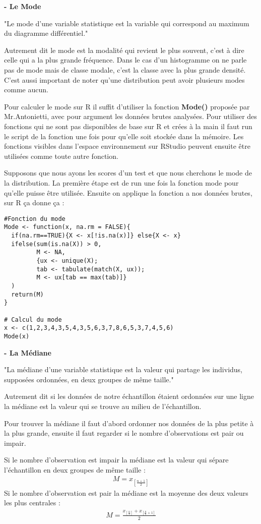 \documentclass{report}
\begin{document}
\textbf{- Le Mode}

"Le mode d'une variable statistique est la variable qui correspond au maximum du diagramme différentiel."

Autrement dit le mode est la modalité qui revient le plus souvent, c'est à dire celle qui a la plus grande fréquence. Dans le cas d'un histogramme on ne parle pas de mode mais de classe modale, c'est la classe avec la plus grande densité. C'est aussi important de noter qu'une distribution peut avoir plusieurs modes comme aucun.

Pour calculer le mode sur R il suffit d'utiliser la fonction \textbf{Mode()} proposée par Mr.Antonietti, avec pour argument les données brutes analysées. Pour utiliser des fonctions qui ne sont pas disponibles de base sur R et crées à la main il faut run le script de la fonction une fois pour qu'elle soit stockée dans la mémoire. Les fonctions visibles dans l'espace environnement sur RStudio peuvent ensuite être utilisées comme toute autre fonction.

Supposons que nous ayons les scores d'un test et que nous cherchons le mode de la distribution. La première étape est de run une fois la fonction mode pour qu'elle puisse être utilisée. Ensuite on applique la fonction a nos données brutes, sur R ça donne ça :

\begin{verbatim}
#Fonction du mode
Mode <- function(x, na.rm = FALSE){
  if(na.rm==TRUE){X <- x[!is.na(x)]} else{X <- x}
  ifelse(sum(is.na(X)) > 0, 
         M <- NA,
         {ux <- unique(X);
         tab <- tabulate(match(X, ux));
         M <- ux[tab == max(tab)]}
  )
  return(M)
}

# Calcul du mode
x <- c(1,2,3,4,3,5,4,3,5,6,3,7,8,6,5,3,7,4,5,6)
Mode(x)
\end{verbatim}

\textbf{- La Médiane}

"La médiane d'une variable statistique est la valeur qui partage les individus, supposées ordonnées, en deux groupes de même taille."

Autrement dit si les données de notre échantillon étaient ordonnées sur une ligne  la médiane est la valeur qui se trouve au milieu de l'échantillon.

Pour trouver la médiane il faut d'abord ordonner nos données de la plus petite à la plus grande, ensuite il faut regarder si le nombre d'observations est pair ou impair. 

Si le nombre d'observation est impair la médiane est la valeur qui sépare l'échantillon en deux groupes de même taille :
\begin{align*}
  M=x_{[\frac{n+1}{2}]}  
\end{align*}
Si le nombre d'observation est pair la médiane est la moyenne des deux valeurs les plus centrales :
\begin{align*}
M=\frac{x_{[\frac{n}{2}]}+x_{[\frac{n}{2}+1]}}{2}
\end{align*}
\end{document}
